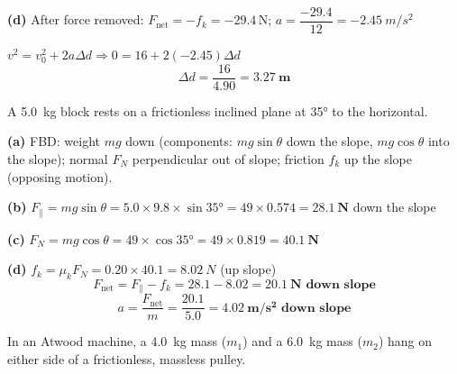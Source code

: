 \documentclass[addpoints]{exam}
\begin{document}
\begin{questions}
\begin{solution}[10cm]
\textbf{(d)} After force removed: $F_\text{net} = -f_k = -29.4\,\text{N}$;\quad
$a = \dfrac{-29.4}{12} = \SI{-2.45}{m/s^2}$

$v^2 = v_0^2 + 2a\Delta d \Rightarrow 0 = 16 + 2(-2.45)\Delta d$
\[
\Delta d = \frac{16}{4.90} = \mathbf{\SI{3.27}{m}}
\]
\end{solution}

\question A \SI{5.0}{kg} block rests on a frictionless inclined plane at \ang{35} to
the horizontal.
\begin{solution}[10cm]
\textbf{(a)} FBD: weight $mg$ down (components: $mg\sin\theta$ down the slope,
$mg\cos\theta$ into the slope); normal $F_N$ perpendicular out of slope;
friction $f_k$ up the slope (opposing motion).

\textbf{(b)} $F_\parallel = mg\sin\theta = 5.0 \times 9.8 \times \sin\ang{35}
= 49 \times 0.574 = \mathbf{\SI{28.1}{N}}$ down the slope

\textbf{(c)} $F_N = mg\cos\theta = 49 \times \cos\ang{35} = 49 \times 0.819
= \mathbf{\SI{40.1}{N}}$

\textbf{(d)} $f_k = \mu_k F_N = 0.20 \times 40.1 = \SI{8.02}{N}$ (up slope)
\[
F_\text{net} = F_\parallel - f_k = 28.1 - 8.02 = \mathbf{\SI{20.1}{N} \text{ down slope}}
\]
\[
a = \frac{F_\text{net}}{m} = \frac{20.1}{5.0} = \mathbf{\SI{4.02}{m/s^2} \text{ down slope}}
\]
\end{solution}

\question In an Atwood machine, a \SI{4.0}{kg} mass ($m_1$) and a \SI{6.0}{kg} mass ($m_2$)
hang on either side of a frictionless, massless pulley.
\begin{parts}

\end{parts}
\end{questions}
\end{document}
